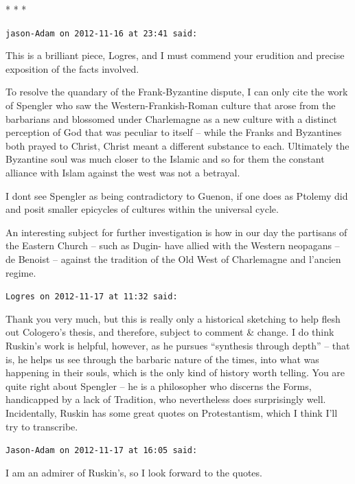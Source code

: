 \begin{center}* * *\end{center}

\begin{footnotesize}
\begin{sffamily}
\texttt{jason-Adam on 2012-11-16 at 23:41 said:}

This is a brilliant piece, Logres, and I must commend your erudition and precise exposition of the facts involved.

To resolve the quandary of the Frank-Byzantine dispute, I can only cite the work of Spengler who saw the Western-Frankish-Roman culture that arose from the barbarians and blossomed under Charlemagne as a new culture with a distinct perception of God that was peculiar to itself -- while the Franks and Byzantines both prayed to Christ, Christ meant a different substance to each. Ultimately the Byzantine soul was much closer to the Islamic and so for them the constant alliance with Islam against the west was not a betrayal.

I dont see Spengler as being contradictory to Guenon, if one does as Ptolemy did and posit smaller epicycles of cultures within the universal cycle.

An interesting subject for further investigation is how in our day the partisans of the Eastern Church -- such as Dugin- have allied with the Western neopagans -- de Benoist -- against the tradition of the Old West of Charlemagne and l'ancien regime.

\hfill

\texttt{Logres on 2012-11-17 at 11:32 said:}

Thank you very much, but this is really only a historical sketching to help flesh out Cologero's thesis, and therefore, subject to comment \& change. I do think Ruskin's work is helpful, however, as he pursues ``synthesis through depth'' -- that is, he helps us see through the barbaric nature of the times, into what was happening in their souls, which is the only kind of history worth telling. You are quite right about Spengler -- he is a philosopher who discerns the Forms, handicapped by a lack of Tradition, who nevertheless does surprisingly well. Incidentally, Ruskin has some great quotes on Protestantism, which I think I'll try to transcribe.

\hfill

\texttt{Jason-Adam on 2012-11-17 at 16:05 said:}

I am an admirer of Ruskin's, so I look forward to the quotes.


\end{sffamily}
\end{footnotesize}
